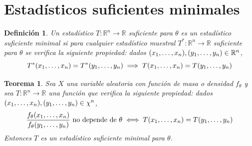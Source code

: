 \documentclass[11pt]{report}
\newtheorem{theorem}{Teorema}
\newtheorem{definition}{Definición}
\theoremstyle{definition}
\newcommand{\R}{\mathbb R}
\begin{document}
\section{Estadísticos suficientes minimales}

\begin{definition}
Un estadístico $T \colon \R^n \to \R$ suficiente para $\theta$ es un \emph{estadístico suficiente minimal} si para cualquier estadístico muestral $T^* \colon \R^n \to \R$ suficiente para $\theta$ se verifica la siguiente propiedad: dados $(x_1,\mathellipsis,x_n), (y_1,\mathellipsis,y_n) \in \R^n$,
\[T^*(x_1,\mathellipsis,x_n) = T^*(y_1,\mathellipsis,y_n) \implies T(x_1,\mathellipsis,x_n) = T(y_1,\mathellipsis,y_n)\]
\end{definition}

\begin{theorem}
Sea $X$ una variable aleatoria con función de masa o densidad $f_\theta$ y sea $T \colon \R^n \to \R$ una función que verifica la siguiente propiedad: dados $(x_1,\mathellipsis,x_n),(y_1,\mathellipsis,y_n) \in \chi^n$,
\[\frac{f_\theta(x_1,\mathellipsis,x_n)}{f_\theta(y_1,\mathellipsis,y_n)} \textup{ no depende de } \theta \iff T(x_1,\mathellipsis,x_n) = T(y_1,\mathellipsis,y_n)\]
Entonces $T$ es un estadístico suficiente minimal para $\theta$.
\end{theorem}
\end{document}
